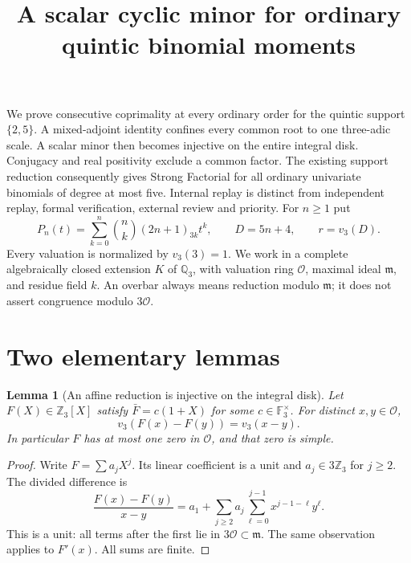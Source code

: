\documentclass[11pt]{article}
\newtheorem{lemma}{Lemma}
\newcommand{\Q}{\mathbb Q}
\begin{document}
\setlength{\emergencystretch}{1em}
\title{A scalar cyclic minor for ordinary quintic binomial moments}
\author{}\date{}\maketitle
We prove consecutive coprimality at every ordinary order for the
quintic support $\{2,5\}$. A mixed-adjoint identity confines every
common root to one three-adic scale. A scalar minor then becomes
injective on the entire integral disk. Conjugacy and real positivity
exclude a common factor. The existing support reduction consequently
gives Strong Factorial for all ordinary univariate binomials of degree
at most five. Internal replay is distinct from independent replay,
formal verification, external review and priority.
For $n\ge1$ put
\[
 P_n(t)=\sum_{k=0}^n\binom nk(2n+1)_{3k}t^k,\qquad
 D=5n+4,\qquad r=v_3(D).
\]
Every valuation is normalized by $v_3(3)=1$.
We work in a complete algebraically closed extension $K$ of $\Q_3$,
with valuation ring $\mathcal O$, maximal ideal $\mathfrak m$, and residue
field $k$. An overbar always means reduction modulo $\mathfrak m$;
it does not assert congruence modulo $3\mathcal O$.

\section{Two elementary lemmas}
\begin{lemma}[An affine reduction is injective on the integral disk]
\label{lem:affine-injectivity}
Let $F(X)\in\mathbb Z_3[X]$ satisfy $\bar F=c(1+X)$ for some
$c\in\mathbb F_3^\times$. For distinct $x,y\in\mathcal O$,
\[
 v_3(F(x)-F(y))=v_3(x-y).
\]
In particular $F$ has at most one zero in $\mathcal O$, and that
zero is simple.
\end{lemma}
\begin{proof}
Write $F=\sum a_jX^j$. Its linear coefficient is a unit and
$a_j\in3\mathbb Z_3$ for $j\ge2$. The divided difference is
\[
 \frac{F(x)-F(y)}{x-y}
 =a_1+\sum_{j\ge2}a_j\sum_{\ell=0}^{j-1}
                          x^{j-1-\ell}y^\ell.
\]
This is a unit: all terms after the first lie in
$3\mathcal O\subset\mathfrak m$.
The same observation applies to $F'(x)$.
All sums are finite.
\end{proof}
\end{document}
